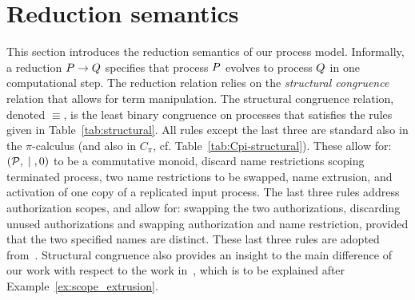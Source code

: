 \section{Reduction semantics}\label{subsec:reduction}
This section introduces the reduction semantics of our process model.
Informally, a reduction $P \rightarrow Q$ specifies that process $P$ evolves to process $Q$ in one computational step. The reduction relation relies on the {\it structural congruence} relation that allows for term manipulation. The structural congruence relation, denoted $\equiv$, is the least binary congruence  on processes that satisfies the rules given in Table~\ref{tab:structural}. All rules except the last three are standard also in the $\pi$-calculus (and also in $C_\pi$, cf. Table~\ref{tab:Cpi-structural}). These allow for: $({\cal P}, \;|\;, 0)$ to be a commutative monoid, discard name restrictions scoping terminated process, two name restrictions to be swapped, name extrusion, and activation of one copy of a replicated input process.
The last three rules address authorization scopes, and allow for: swapping the two authorizations, discarding unused authorizations and swapping authorization and name restriction, provided that the two specified names are distinct. These last three rules are adopted from~\cite{clar:eke}. Structural congruence also provides an insight to the main difference of our work with respect to the work in~\cite{clar:eke}, which is to be explained after 
Example~\ref{ex:scope_extrusion}. %

